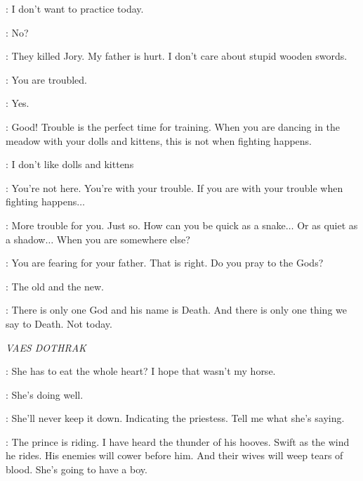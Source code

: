 \ARYA:  I don't want to practice today. 

\SYRIO: No? 

\ARYA:  They killed Jory. My father is hurt. I don't care about stupid wooden swords. 

\SYRIO: You are troubled. 

\ARYA:  Yes. 

\SYRIO: Good! Trouble is the perfect time for training. When you are dancing in the meadow with your dolls and kittens, this is not when fighting happens. 

\ARYA:  I don't like dolls and kittens

\SYRIO:  You're not here. You're with your trouble. If you are with your trouble when fighting happens$\ldots$ 


\SYRIO:  More trouble for you. Just so. How can you be quick as a snake$\ldots$  Or as quiet as a shadow$\ldots$ When you are somewhere else?


\SYRIO: You are fearing for your father. That is right. Do you pray to the Gods? 

\ARYA:  The old and the new. 

\SYRIO:  There is only one God and his name is Death. And there is only one thing we say to Death. Not today. 



\scene

\textit{VAES DOTHRAK} 


\VISERYS:  She has to eat the whole heart?  I hope that wasn't my horse. 


\JORAH:  She's doing well. 

\VISERYS:  She'll never keep it down. Indicating the priestess. Tell me what she's saying. 

\JORAH:  The prince is riding. I have heard the thunder of his hooves. Swift as the wind he rides. His enemies will cower before him. And their wives will weep tears of blood. She's going to have a boy. 

